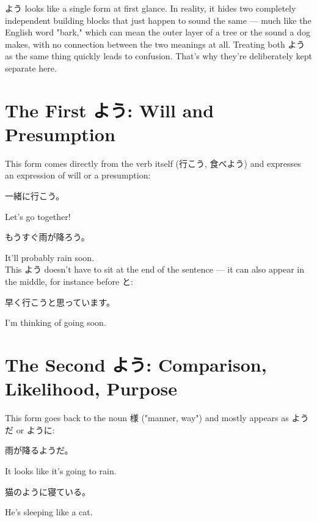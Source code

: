 \documentclass[12pt]{book}
\begin{document}
よう looks like a single form at first glance. In reality, it hides two completely independent building blocks that just happen to sound the same — much like the English word "bark," which can mean the outer layer of a tree or the sound a dog makes, with no connection between the two meanings at all. Treating both よう as the same thing quickly leads to confusion. That's why they're deliberately kept separate here.

\section*{The First よう: Will and Presumption}

This form comes directly from the verb itself (行こう, 食べよう) and expresses an expression of will or a presumption:

\par\quad 一緒に行こう。\\
\par\quad Let's go together!\\

\par\quad もうすぐ雨が降ろう。\\
\par\quad It'll probably rain soon.\\

This よう doesn't have to sit at the end of the sentence — it can also appear in the middle, for instance before と:

\par\quad 早く行こうと思っています。\\
\par\quad I'm thinking of going soon.\\

\section*{The Second よう: Comparison, Likelihood, Purpose}

This form goes back to the noun 様 ("manner, way") and mostly appears as ようだ or ように:

\par\quad 雨が降るようだ。\\
\par\quad It looks like it's going to rain.\\

\par\quad 猫のように寝ている。\\
\par\quad He's sleeping like a cat.\\
\end{document}
